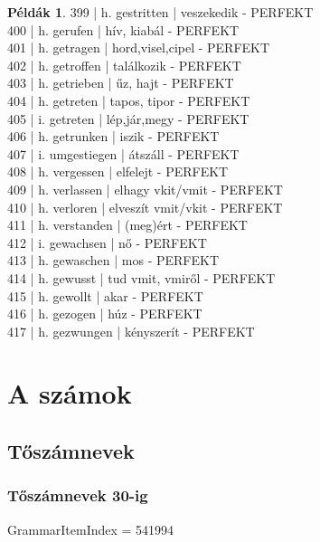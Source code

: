 \documentclass{article}
\theoremstyle{definition}
\newtheorem*{exmp}{Példák}
\begin{document}
\begin{exmp}
399 | h. gestritten | veszekedik - PERFEKT\\
400 | h. gerufen | hív, kiabál - PERFEKT\\
401 | h. getragen | hord,visel,cipel - PERFEKT\\
402 | h. getroffen | találkozik - PERFEKT\\
403 | h. getrieben | űz, hajt - PERFEKT\\
404 | h. getreten | tapos, tipor - PERFEKT\\
405 | i.  getreten | lép,jár,megy - PERFEKT\\
406 | h. getrunken | iszik - PERFEKT\\
407 | i. umgestiegen | átszáll - PERFEKT\\
408 | h. vergessen | elfelejt - PERFEKT\\
409 | h. verlassen | elhagy vkit/vmit - PERFEKT\\
410 | h. verloren | elveszít vmit/vkit - PERFEKT\\
411 | h. verstanden | (meg)ért - PERFEKT\\
412 | i. gewachsen | nő - PERFEKT\\
413 | h. gewaschen | mos - PERFEKT\\
414 | h. gewusst | tud vmit, vmiről - PERFEKT\\
415 | h. gewollt | akar - PERFEKT\\
416 | h. gezogen | húz - PERFEKT\\
417 | h. gezwungen | kényszerít - PERFEKT\\
\end{exmp}

\section{A számok}

\subsection{Tőszámnevek}

\subsubsection{Tőszámnevek 30-ig}

GrammarItemIndex = 541994
\end{document}
